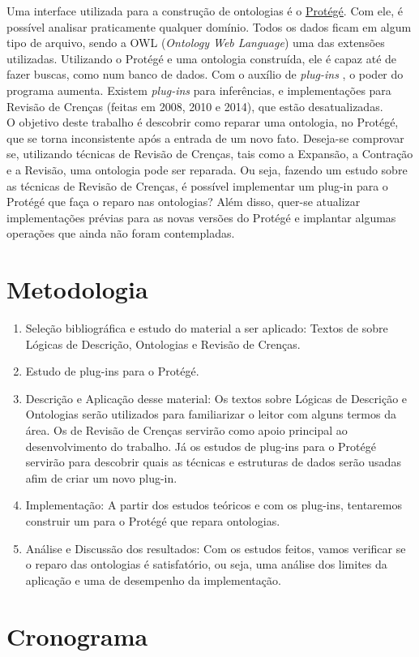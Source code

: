 \documentclass[12pt,letterpaper]{article}
\begin{document}
	Uma interface utilizada para a construção de ontologias é o \href{https://protege.stanford.edu/}{Protégé}. Com ele, é possível analisar praticamente qualquer domínio. Todos os dados ficam em algum tipo de arquivo, sendo a OWL (\textit{Ontology Web Language}) uma das extensões utilizadas. Utilizando o Protégé e uma ontologia construída, ele é capaz até de fazer buscas, como num banco de dados. Com o auxílio de \textit{plug-ins} \cite{resina2014belief} \cite{ribeiro2008}, o poder do programa aumenta. Existem \textit{plug-ins} para inferências, e implementações para Revisão de Crenças (feitas em 2008, 2010 e 2014), que estão desatualizadas. \\ 
	
	O objetivo deste trabalho é descobrir como reparar uma ontologia, no Protégé, que se torna inconsistente após a entrada de um novo fato. Deseja-se comprovar se, utilizando técnicas de Revisão de Crenças, tais como a Expansão, a Contração e a Revisão, uma ontologia pode ser reparada. Ou seja, fazendo um estudo sobre as técnicas de Revisão de Crenças, é possível implementar um plug-in para o Protégé que faça o reparo nas ontologias? Além disso, quer-se atualizar implementações prévias para as novas versões do Protégé e implantar algumas operações que ainda não foram contempladas.  \\
	
	\clearpage
	
	\section{Metodologia}
	
	\begin{enumerate}
		\item Seleção bibliográfica e estudo do material a ser aplicado: Textos de sobre Lógicas de Descrição, Ontologias e Revisão de Crenças. 
		\item Estudo de plug-ins para o Protégé.
		\item Descrição e Aplicação desse material: Os textos sobre Lógicas de Descrição e Ontologias serão utilizados para familiarizar o leitor com alguns termos da área. Os de Revisão de Crenças servirão como apoio principal ao desenvolvimento do trabalho. Já os estudos de plug-ins para o Protégé servirão para descobrir quais as técnicas e estruturas de dados serão usadas afim de criar um novo plug-in. 
		\item Implementação: A partir dos estudos teóricos e com os plug-ins, tentaremos construir um para o Protégé que repara ontologias.
		\item Análise e Discussão dos resultados: Com os estudos feitos, vamos verificar se o reparo das ontologias é satisfatório, ou seja, uma análise dos limites da aplicação e uma de desempenho da implementação.
	\end{enumerate}
	
	\section{Cronograma}
	
	
	
	 
\end{document}
